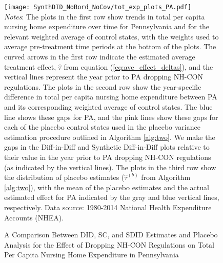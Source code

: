 \documentclass[../Main.tex]{subfiles}
\begin{document}
\newpage
{}
\begin{figure}[t] 
    \setlength{}
	\caption{\label{fig:tot_exp_plots_pa} \centering A Comparison Between DID, SC, and SDID Estimates and Placebo Analysis for the Effect of Dropping NH-CON Regulations on Total Per Capita Nursing Home Expenditure in Pennsylvania} {\centering\texttt{[image: SynthDID\_NoBord\_NoCov/tot\_exp\_plots\_PA.pdf]}}
    \vspace{-1.4cm}\\
    \scriptsize
		\textit{Notes}: The plots in the first row show trends in total per capita nursing home expenditure over time for Pennsylvania and for the relevant weighted average of control states, with the weights used to average pre-treatment time periods at the bottom of the plots. The curved arrows in the first row indicate the estimated average treatment effect, $\hat{\tau}$ from equation (\ref{eq:ave_effect_deltas}), and the vertical lines represent the year prior to PA dropping NH-CON regulations. The plots in the second row show the year-specific difference in total per capita nursing home expenditure between PA and its corresponding weighted average of control states. The blue line shows these gaps for PA, and the pink lines show these gaps for each of the placebo control states used in the placebo variance estimation procedure outlined in Algorithm \ref{alg:two}. We make the gaps in the Diff-in-Diff and Synthetic Diff-in-Diff plots relative to their value in the year prior to PA dropping NH-CON regulations (as indicated by the vertical lines). The plots in the third row show the distribution of placebo estimates ($\hat{\tau}^{(b)}$ from Algorithm \ref{alg:two}), with the mean of the placebo estimates and the actual estimated effect for PA indicated by the gray and blue vertical lines, respectively. Data source: 1980-2014 National Health Expenditure Accounts (NHEA).
\end{figure}
\restoregeometry
\clearpage
\end{document}

